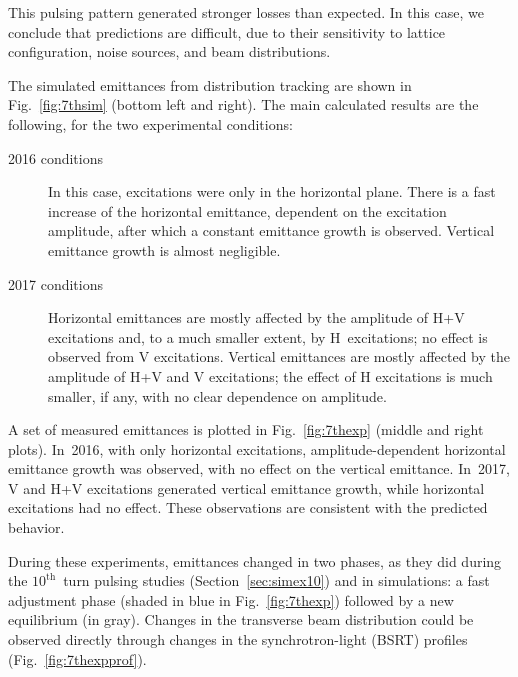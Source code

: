 \documentclass[%
 reprint,
 amsmath,amssymb,
 aps,
prstab,
longbibliography
]{revtex4-1}
\begin{document}
This pulsing pattern generated stronger losses than expected. In this
case, we conclude that predictions are difficult, due to their
sensitivity to lattice configuration, noise sources, and beam
distributions.

The simulated emittances from distribution tracking are shown in
Fig.~\ref{fig:7thsim} (bottom left and right). The main calculated
results are the following, for the two experimental conditions:
%
\begin{description}
\item[2016 conditions] In this case, excitations were only in the
  horizontal plane. There is a fast increase of the horizontal
  emittance, dependent on the excitation amplitude, after which a
  constant emittance growth is observed. Vertical emittance growth is
  almost negligible.
\item[2017 conditions] Horizontal emittances are mostly affected by
  the amplitude of H+V excitations and, to a much smaller extent, by
  H~excitations; no effect is observed from V excitations. Vertical
  emittances are mostly affected by the amplitude of H+V and V
  excitations; the effect of H excitations is much smaller, if any,
  with no clear dependence on amplitude.
\end{description}

A set of measured emittances is plotted in Fig.~\ref{fig:7thexp}
(middle and right plots). In~2016, with only horizontal excitations,
amplitude-dependent horizontal emittance growth was observed, with no
effect on the vertical emittance. In~2017, V and H+V excitations
generated vertical emittance growth, while horizontal excitations had
no effect. These observations are consistent with the predicted
behavior.

During these experiments, emittances changed in two phases, as they
did during the $10^{\mathrm{th}}$~turn pulsing studies
(Section~\ref{sec:simex10}) and in simulations: a fast adjustment
phase (shaded in blue in Fig.~\ref{fig:7thexp}) followed by a new
equilibrium (in gray). Changes in the transverse beam distribution
could be observed directly through changes in the synchrotron-light
(BSRT) profiles (Fig.~\ref{fig:7thexpprof}).
\end{document}
